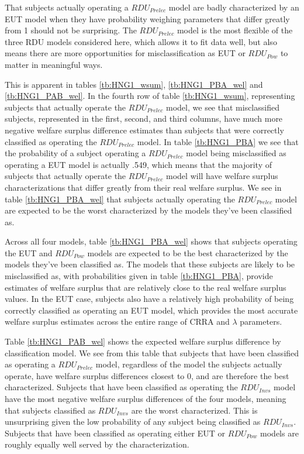 \documentclass[../main.tex]{subfiles}
\begin{document}
That subjects actually operating a $\mathit{RDU_{Prelec}}$ model are badly characterized by an EUT model when they have probability weighing parameters that differ greatly from 1 should not be surprising.
The $\mathit{RDU_{Prelec}}$ model is the most flexible of the three RDU models considered here, which allows it to fit data well, but also means there are more opportunities for misclassification as EUT or $\mathit{RDU_{Pow}}$ to matter in meaningful ways.

This is apparent in tables \ref{tb:HNG1_wsum}, \ref{tb:HNG1_PBA_wel} and \ref{tb:HNG1_PAB_wel}.
In the fourth row of table \ref{tb:HNG1_wsum}, representing subjects that actually operate the $\mathit{RDU_{Prelec}}$ model, we see that misclassified subjects, represented in the first, second, and third columns, have much more negative welfare surplus difference estimates than subjects that were correctly classified as operating the $\mathit{RDU_{Prelec}}$ model.
In table \ref{tb:HNG1_PBA} we see that the probability of a subject operating a $\mathit{RDU_{Prelec}}$ model being misclassified as operating a EUT model is actually .549, which means that the majority of subjects that actually operate the $\mathit{RDU_{Prelec}}$ model will have welfare surplus characterizations that differ greatly from their real welfare surplus.
We see in table \ref{tb:HNG1_PBA_wel} that subjects actually operating the $\mathit{RDU_{Prelec}}$ model are expected to be the worst characterized by the models they've been classified as.

Across all four models, table \ref{tb:HNG1_PBA_wel} shows that subjects operating the EUT and $\mathit{RDU_{Pow}}$ models are expected to be the best characterized by the models they've been classified as.
The models that these subjects are likely to be misclassified as, with probabilities given in table \ref{tb:HNG1_PBA}, provide estimates of welfare surplus that are relatively close to the real welfare surplus values.
In the EUT case, subjects also have a relatively high probability of being correctly classified as operating an EUT model, which provides the most accurate welfare surplus estimates across the entire range of CRRA and $\lambda$ parameters.

Table \ref{tb:HNG1_PAB_wel} shows the expected welfare surplus difference by classification model.
We see from this table that subjects that have been classified as operating a $\mathit{RDU_{Prelec}}$ model, regardless of the model the subjects actually operate, have welfare surplus differences closest to 0, and are therefore the best characterized.
Subjects that have been classified as operating the $\mathit{RDU_{Invs}}$ model have the most negative welfare surplus differences of the four models, meaning that subjects classified as $\mathit{RDU_{Invs}}$ are the worst characterized.
This is unsurprising given the low probability of any subject being classified as $\mathit{RDU_{Invs}}$.
Subjects that have been classified as operating either EUT or $\mathit{RDU_{Pow}}$ models are roughly equally well served by the characterization.
\end{document}
